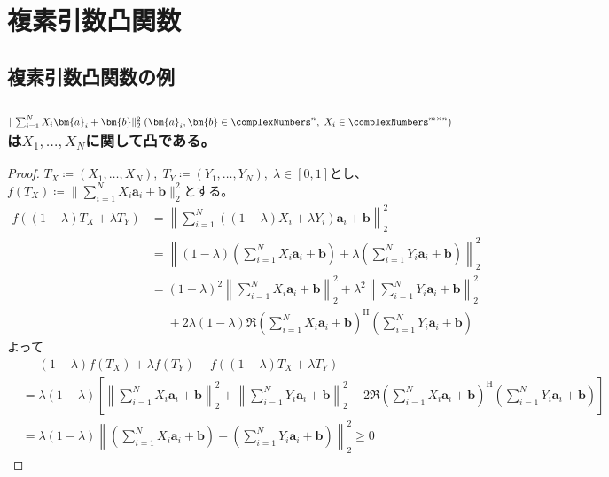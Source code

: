 \chapter{複素引数凸関数}
    \section{複素引数凸関数の例}
        \label{複素引数凸関数の例}
        \subsection{\texorpdfstring{$\|\sum_{i=1}^N X_i\bm{a}_i + \bm{b}\|_2^2\;(\bm{a}_i, \bm{b} \in \complexNumbers^n,\;X_i \in \complexNumbers^{m\times n})$}{行列X1,X2,...,XNの線形結合×ベクトル+定数のノルム}は\texorpdfstring{$X_1,\dotsc,X_N$}{X1,X2,...,XN}に関して凸である。}
            \begin{proof}
                \quad\par
                $T_X \coloneq (X_1,\dotsc,X_N),\;T_Y \coloneq (Y_1,\dotsc,Y_N),\;\lambda \in [0,1]$とし、$f(T_X) \coloneq \|\sum_{i=1}^N X_i\bm{a}_i + \bm{b}\|_2^2$とする。
                \begin{align*}
                    f((1-\lambda)T_X + \lambda T_Y) &= \left\|\sum_{i=1}^N ((1-\lambda)X_i + \lambda Y_i)\bm{a}_i + \bm{b}\right\|_2^2 \\
                    &= \left\|(1-\lambda)\left(\sum_{i=1}^N X_i\bm{a}_i + \bm{b}\right) + \lambda\left(\sum_{i=1}^N Y_i\bm{a}_i + \bm{b}\right)\right\|_2^2 \\
                    &= (1-\lambda)^2\left\|\sum_{i=1}^N X_i\bm{a}_i + \bm{b}\right\|_2^2 + \lambda^2\left\|\sum_{i=1}^N Y_i\bm{a}_i + \bm{b}\right\|_2^2 \\
                    &\phantom{=} + 2\lambda(1-\lambda)\Re{\left(\sum_{i=1}^N X_i\bm{a}_i + \bm{b}\right)^\mathrm{H}\left(\sum_{i=1}^N Y_i\bm{a}_i + \bm{b}\right)}
                \end{align*}
                よって
                \begin{align*}
                    &\phantom{=} (1-\lambda)f(T_X) + \lambda f(T_Y) - f((1-\lambda)T_X + \lambda T_Y) \\
                    &= \lambda(1-\lambda)\left[\left\|\sum_{i=1}^N X_i\bm{a}_i + \bm{b}\right\|_2^2 + \left\|\sum_{i=1}^N Y_i\bm{a}_i + \bm{b}\right\|_2^2 - 2\Re{\left(\sum_{i=1}^N X_i\bm{a}_i + \bm{b}\right)^\mathrm{H}\left(\sum_{i=1}^N Y_i\bm{a}_i + \bm{b}\right)}\right] \\
                    &= \lambda(1-\lambda)\left\|\left(\sum_{i=1}^N X_i\bm{a}_i + \bm{b}\right) - \left(\sum_{i=1}^N Y_i\bm{a}_i + \bm{b}\right)\right\|_2^2 \geq 0
                \end{align*}
            \end{proof}
